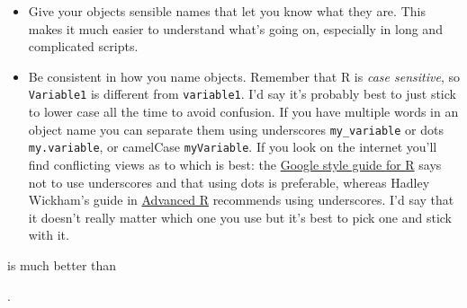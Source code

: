 \documentclass[
]{book}
\newenvironment{Shaded}{\begin{snugshade}}{\end{snugshade}}
\newcommand{\DataTypeTok}[1]{\textcolor[rgb]{0.13,0.29,0.53}{#1}}
\newcommand{\KeywordTok}[1]{\textcolor[rgb]{0.13,0.29,0.53}{\textbf{#1}}}
\newcommand{\NormalTok}[1]{#1}
\newcommand{\OperatorTok}[1]{\textcolor[rgb]{0.81,0.36,0.00}{\textbf{#1}}}
\newcommand{\OtherTok}[1]{\textcolor[rgb]{0.56,0.35,0.01}{#1}}
\newcommand{\StringTok}[1]{\textcolor[rgb]{0.31,0.60,0.02}{#1}}
\begin{document}
\begin{itemize}
\item
  Give your objects sensible names that let you know what they are. This makes it much easier to understand what's going on, especially in long and complicated scripts.
\item
  Be consistent in how you name objects. Remember that R is \emph{case sensitive}, so \texttt{Variable1} is different from \texttt{variable1}. I'd say it's probably best to just stick to lower case all the time to avoid confusion. If you have multiple words in an object name you can separate them using underscores \texttt{my\_variable} or dots \texttt{my.variable}, or camelCase \texttt{myVariable}. If you look on the internet you'll find conflicting views as to which is best: the \href{https://google.github.io/styleguide/Rguide.xml}{Google style guide for R} says not to use underscores and that using dots is preferable, whereas Hadley Wickham's guide in \href{http://adv-r.had.co.nz/Style.html}{Advanced R} recommends using underscores. I'd say that it doesn't really matter which one you use but it's best to pick one and stick with it.
\end{itemize}

\begin{Shaded}
\end{Shaded}

is much better than

\begin{Shaded}
\end{Shaded}

.
\end{document}
